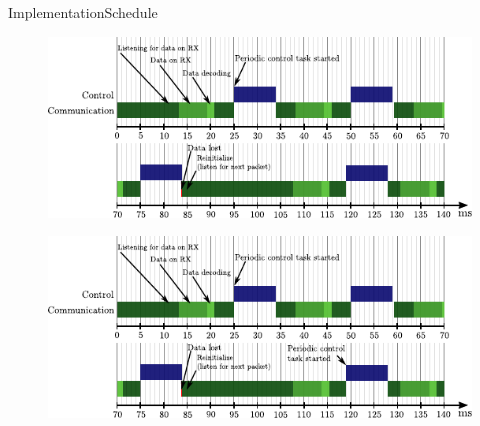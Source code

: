 \begin{frame}{Implementation}{Schedule}
    {
      \begin{figure}[H]
        \hspace*{-.8cm}
        \includegraphics[width=1.1\linewidth]{figures/newTimingDiagram7}
      \end{figure}
    }
    {
      \begin{figure}[H]
        \hspace*{-.8cm}
        \includegraphics[width=1.1\linewidth]{figures/newTimingDiagram8}
      \end{figure}
    }
\end{frame}

